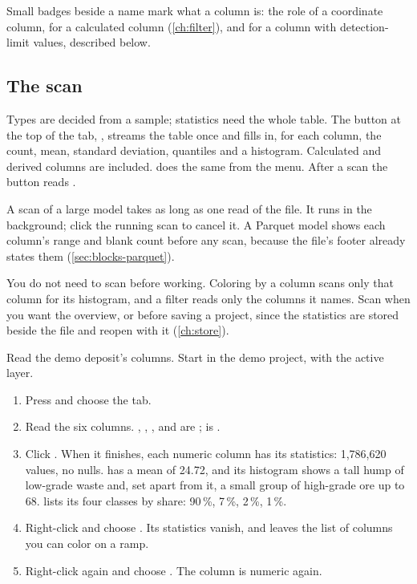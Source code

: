 Small badges beside a name mark what a column is: the role of a coordinate column,  for a calculated column (\cref{ch:filter}), and  for a column with detection-limit values, described below.

\subsection{The scan}\label{sec:columns-scan}

Types are decided from a sample; statistics need the whole table. The button at the top of the tab, , streams the table once and fills in, for each column, the count, mean, standard deviation, quantiles and a histogram. Calculated and derived columns are included.  does the same from the menu. After a scan the button reads .

A scan of a large model takes as long as one read of the file. It runs in the background; click the running scan to cancel it. A Parquet model shows each column's range and blank count before any scan, because the file's footer already states them (\cref{sec:blocks-parquet}).

You do not need to scan before working. Coloring by a column scans only that column for its histogram, and a filter reads only the columns it names. Scan when you want the overview, or before saving a project, since the statistics are stored beside the file and reopen with it (\cref{ch:store}).

\begin{tryit}
Read the demo deposit's columns. Start in the demo project, with  the active layer.
\begin{enumerate}
\item Press  and choose the  tab.
\item Read the six columns. , , ,  and  are ;  is .
\item Click . When it finishes, each numeric column has its statistics: 1,786,620 values, no nulls.  has a mean of 24.72, and its histogram shows a tall hump of low-grade waste and, set apart from it, a small group of high-grade ore up to 68.  lists its four classes by share:  90\,\%,  7\,\%,  2\,\%,  1\,\%.
\item Right-click  and choose . Its statistics vanish, and  leaves the list of columns you can color on a ramp.
\item Right-click  again and choose . The column is numeric again.
\end{enumerate}
\end{tryit}

